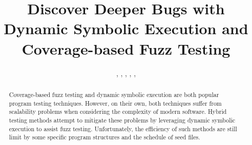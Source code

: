 \documentclass{cta-author}
\begin{document}

\title{Discover Deeper Bugs with Dynamic Symbolic Execution and Coverage-based Fuzz Testing}

\author{, , , , ,  }
%
\address{
}

\begin{abstract}
%
%
Coverage-based fuzz testing and dynamic symbolic execution are both popular program testing techniques. However, on their own, both techniques suffer from scalability problems when considering the complexity of modern software. Hybrid testing methods attempt to mitigate these problems by leveraging dynamic symbolic execution to assist fuzz testing. Unfortunately, the efficiency of such methods are still limit by some specific program structures and the schedule of seed files.


\end{abstract}
\end{document}

